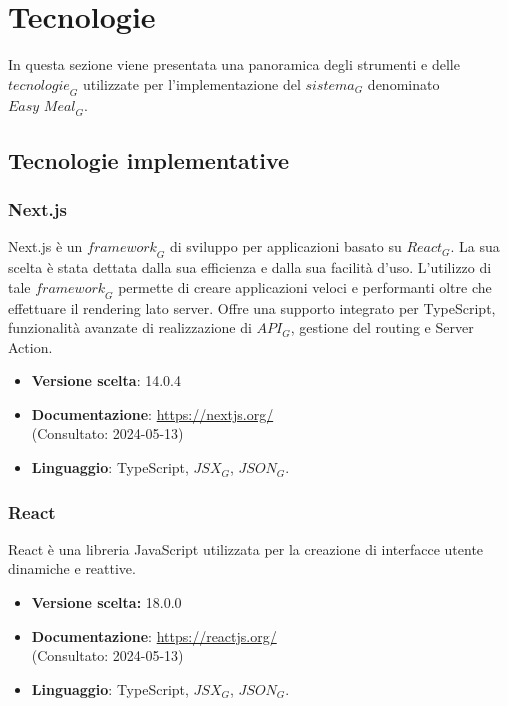 \section{Tecnologie}
In questa sezione viene presentata una panoramica degli strumenti e delle $\textit{tecnologie}_G$ utilizzate per l'implementazione del $\textit{sistema}_G$ denominato $\textit{Easy Meal}_G$. 
\subsection{Tecnologie implementative}
\subsubsection{Next.js}
Next.js è un $\textit{framework}_G$ di sviluppo per applicazioni basato su $\textit{React}_G$. La sua scelta è stata dettata dalla sua efficienza e dalla sua facilità d'uso. L'utilizzo di tale $\textit{framework}_G$ permette di creare applicazioni veloci e performanti oltre che effettuare il rendering lato server. Offre una supporto integrato per TypeScript, funzionalità avanzate di realizzazione di $\textit{API}_G$, gestione del routing e Server Action.
\begin{itemize}
    \item \textbf{Versione scelta}: 14.0.4
    \item \textbf{Documentazione}: \url{https://nextjs.org/}\\
    (Consultato: 2024-05-13)
    \item \textbf{Linguaggio}: TypeScript, $\textit{JSX}_G$, $\textit{JSON}_G$.
\end{itemize}

\subsubsection{React}
React è una libreria JavaScript utilizzata per la creazione di interfacce utente dinamiche e reattive.
\begin{itemize}
    \item \textbf{Versione scelta:} 18.0.0
    \item \textbf{Documentazione}: \url{https://reactjs.org/}\\
    (Consultato: 2024-05-13)
    \item \textbf{Linguaggio}: TypeScript, $\textit{JSX}_G$, $\textit{JSON}_G$.
\end{itemize}

